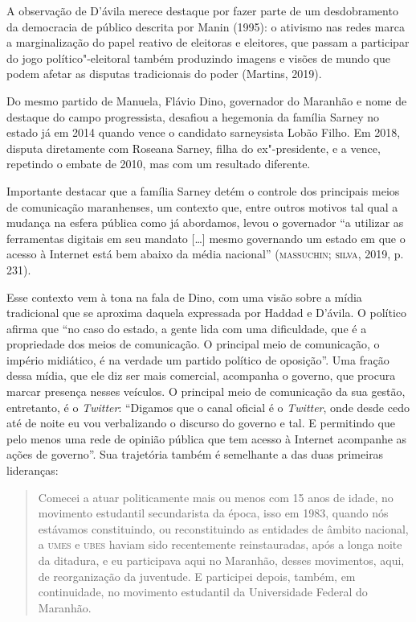 A observação de D'ávila merece destaque por fazer parte de um
desdobramento da democracia de público descrita por Manin (1995): o
ativismo nas redes marca a marginalização do papel reativo de eleitoras
e eleitores, que passam a participar do jogo político"-eleitoral também
produzindo imagens e visões de mundo que podem afetar as disputas
tradicionais do poder (Martins, 2019).

Do mesmo partido de Manuela, Flávio Dino, governador do Maranhão e nome
de destaque do campo progressista, desafiou a hegemonia da família
Sarney no estado já em 2014 quando vence o candidato sarneysista Lobão
Filho. Em 2018, disputa diretamente com Roseana Sarney, filha do
ex"-presidente, e a vence, repetindo o embate de 2010, mas com um
resultado diferente.

Importante destacar que a família Sarney detém o controle dos principais
meios de comunicação maranhenses, um contexto que, entre outros motivos
tal qual a mudança na esfera pública como já abordamos, levou o
governador ``a utilizar as ferramentas digitais em seu mandato {[}\ldots{}{]}
mesmo governando um estado em que o acesso à Internet está bem abaixo da
média nacional'' (\textsc{massuchin}; \textsc{silva}, 2019, p.\,231).

Esse contexto vem à tona na fala de Dino, com uma visão sobre a mídia
tradicional que se aproxima daquela expressada por Haddad e D'ávila. O
político afirma que ``no caso do estado, a gente lida com uma
dificuldade, que é a propriedade dos meios de comunicação. O principal
meio de comunicação, o império midiático, é na verdade um partido
político de oposição''. Uma fração dessa mídia, que ele diz ser mais
comercial, acompanha o governo, que procura marcar presença nesses
veículos. O principal meio de comunicação da sua gestão, entretanto, é o
\emph{Twitter}: ``Digamos que o canal oficial é o \emph{Twitter}, onde
desde cedo até de noite eu vou verbalizando o discurso do governo e tal.
E permitindo que pelo menos uma rede de opinião pública que tem acesso à
Internet acompanhe as ações de governo''. Sua trajetória também é
semelhante a das duas primeiras lideranças:

\begin{quote}
Comecei a atuar politicamente mais ou menos com 15 anos de idade, no
movimento estudantil secundarista da época, isso em 1983, quando nós
estávamos constituindo, ou reconstituindo as entidades de âmbito
nacional, a \textsc{umes} e \textsc{ubes} haviam sido recentemente reinstauradas, após a
longa noite da ditadura, e eu participava aqui no Maranhão, desses
movimentos, aqui, de reorganização da juventude. E participei depois,
também, em continuidade, no movimento estudantil da Universidade Federal
do Maranhão.
\end{quote}

